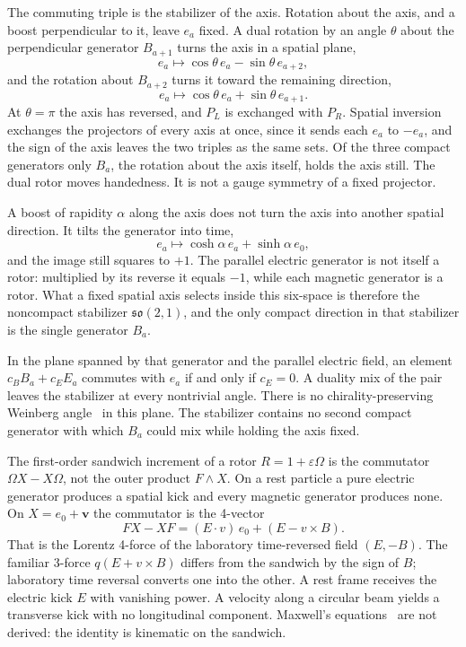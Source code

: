 \documentclass[a4paper]{article}
\begin{document}
The commuting triple is the stabilizer of the axis. Rotation about the axis, and a boost perpendicular to it, leave $e_a$ fixed. A dual rotation by an angle $\theta$ about the perpendicular generator $B_{a+1}$ turns the axis in a spatial plane,
\[
e_a \mapsto \cos\theta\, e_a - \sin\theta\, e_{a+2},
\]
and the rotation about $B_{a+2}$ turns it toward the remaining direction,
\[
e_a \mapsto \cos\theta\, e_a + \sin\theta\, e_{a+1}.
\]
At $\theta=\pi$ the axis has reversed, and $P_L$ is exchanged with $P_R$. Spatial inversion exchanges the projectors of every axis at once, since it sends each $e_a$ to $-e_a$, and the sign of the axis leaves the two triples as the same sets. Of the three compact generators only $B_a$, the rotation about the axis itself, holds the axis still. The dual rotor moves handedness. It is not a gauge symmetry of a fixed projector.

A boost of rapidity $\alpha$ along the axis does not turn the axis into another spatial direction. It tilts the generator into time,
\[
e_a \mapsto \cosh\alpha\, e_a + \sinh\alpha\, e_0,
\]
and the image still squares to $+1$. The parallel electric generator is not itself a rotor: multiplied by its reverse it equals $-1$, while each magnetic generator is a rotor. What a fixed spatial axis selects inside this six-space is therefore the noncompact stabilizer $\mathfrak{so}(2,1)$, and the only compact direction in that stabilizer is the single generator $B_a$.

In the plane spanned by that generator and the parallel electric field, an element $c_B B_a + c_E E_a$ commutes with $e_a$ if and only if $c_E=0$. A duality mix of the pair leaves the stabilizer at every nontrivial angle. There is no chirality-preserving Weinberg angle~\cite{weinberg1967} in this plane. The stabilizer contains no second compact generator with which $B_a$ could mix while holding the axis fixed.

The first-order sandwich increment of a rotor $R=1+\varepsilon\Omega$ is the commutator $\Omega X-X\Omega$, not the outer product $F\wedge X$. On a rest particle a pure electric generator produces a spatial kick and every magnetic generator produces none. On $X=e_0+\mathbf{v}$ the commutator is the 4-vector
\begin{equation}
\label{eq:faraday-lorentz}
FX-XF=(E\cdot v)\,e_0+(E-v\times B).
\end{equation}
That is the Lorentz 4-force of the laboratory time-reversed field $(E,-B)$. The familiar 3-force $q(E+v\times B)$ differs from the sandwich by the sign of $B$; laboratory time reversal converts one into the other. A rest frame receives the electric kick $E$ with vanishing power. A velocity along a circular beam yields a transverse kick with no longitudinal component. Maxwell's equations~\cite{maxwell1865} are not derived: the identity is kinematic on the sandwich.
\end{document}
